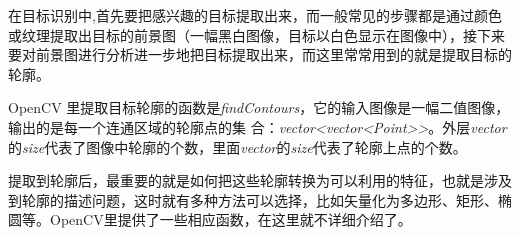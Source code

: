 \documentclass{XDBAthesis}
\begin{document}
在目标识别中,首先要把感兴趣的目标提取出来，而一般常见的步骤都是通过颜色或纹理提取出目标的前景图（一幅黑白图像，目标以白色显示在图像中），接下来要对前景图进行分析进一步地把目标提取出来，而这里常常用到的就是提取目标的轮廓。

OpenCV 里提取目标轮廓的函数是\emph{findContours}，它的输入图像是一幅二值图像，输出的是每一个连通区域的轮廓点的集 合：\emph{vector<vector<Point>>}。外层\emph{vector}的\emph{size}代表了图像中轮廓的个数，里面\emph{vector}的\emph{size}代表了轮廓上点的个数。

提取到轮廓后，最重要的就是如何把这些轮廓转换为可以利用的特征，也就是涉及到轮廓的描述问题，这时就有多种方法可以选择，比如矢量化为多边形、矩形、椭圆等。OpenCV里提供了一些相应函数，在这里就不详细介绍了。  


\ifx\allfiles\undefined
%

\end{document}
